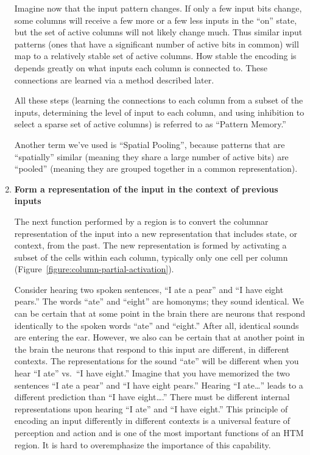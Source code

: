 \begin{enumerate}
Imagine now that the input pattern changes. If only a few input bits
change, some columns will receive a few more or a few less inputs in
the ``on'' state, but the set of active columns will not likely change
much. Thus similar input patterns (ones that have a significant number
of active bits in common) will map to a relatively stable set of
active columns. How stable the encoding is depends greatly on what
inputs each column is connected to. These connections are learned via
a method described later.

All these steps (learning the connections to each column from a subset
of the inputs, determining the level of input to each column, and
using inhibition to select a sparse set of active columns) is referred
to as ``Pattern Memory.''

Another term we've used is ``Spatial Pooling'', because patterns that are
``spatially'' similar (meaning they share a large number of active
bits) are ``pooled'' (meaning they are grouped together in a common
representation).

\item {\bf Form a representation of the input in the context of
  previous inputs}

The next function performed by a region is to convert the columnar
representation of the input into a new representation that includes
state, or context, from the past. The new representation is formed by
activating a subset of the cells within each column, typically only
one cell per column (Figure~\ref{figure:column-partial-activation}).

Consider hearing two spoken sentences, ``I ate a pear'' and ``I have
eight pears.'' The words ``ate'' and ``eight'' are homonyms; they
sound identical. We can be certain that at some point in the brain
there are neurons that respond identically to the spoken words ``ate''
and ``eight.'' After all, identical sounds are entering the
ear. However, we also can be certain that at another point in the
brain the neurons that respond to this input are different, in
different contexts. The representations for the sound ``ate'' will be
different when you hear ``I ate'' vs.\ ``I have eight.'' Imagine that
you have memorized the two sentences ``I ate a pear'' and ``I have
eight pears.'' Hearing ``I ate\dots'' leads to a different prediction
than ``I have eight\dots.'' There must be different internal
representations upon hearing ``I ate'' and ``I have eight.'' This
principle of encoding an input differently in different contexts is a
universal feature of perception and action and is one of the most
important functions of an HTM region. It is hard to overemphasize the
importance of this capability.


\end{enumerate}
